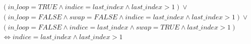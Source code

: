 \begin{align*}
&(in\_loop=TRUE \land indice=last\_index \land last\_index>1) \lor \\
&(in\_loop=FALSE \land swap=FALSE \land indice=last\_index \land last\_index>1) \lor \\
&(in\_loop=FALSE \land indice=last\_index \land swap=TRUE \land last\_index>1) \\
&\Leftrightarrow indice=last\_index \land last\_index>1
\end{align*}









